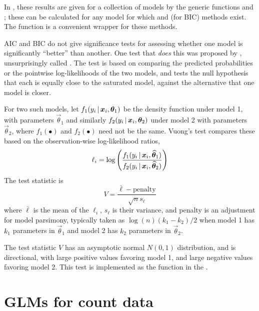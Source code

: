 \documentclass[11pt]{book}\usepackage[]{graphicx}\usepackage[]{color}
\begin{document}
In \R, these results are given for a collection of models by the generic functions
 and ; these can be calculated for any model for which 
 and (for BIC)  methods exist.
The  function  is a convenient wrapper for these
methods. 

AIC and BIC do not give significance tests for assessing whether one model is
significantly ``better'' than another.  One test that \emph{does} this was proposed by
\citet{Vuong:1989}, unsurprisingly called . 
The test is based on comparing the predicted probabilities
or the pointwise log-likelihoods of the two models, and tests the null hypothesis
that each is equally close to the saturated model, against the alternative that 
one model is closer. 

For two such models, let $f_1 (y_i \, | \, \bm{x}_i, \bm{\theta}_1)$
be the density function under model 1, with parameters $\vec{\theta}_1$
and similarly
$f_2 (y_i \, | \, \bm{x}_i, \bm{\theta}_2)$ under model 2 with parameters $\vec{\theta}_2$,
where $f_1(\bullet)$ and $f_2(\bullet)$ need not be the same.
Vuong's test compares these based on the observation-wise log-likelihood ratios,
\begin{equation*}
\ell_i = \log \left( 
              \frac{f_1 (y_i \, | \, \bm{x}_i, \bm{\widehat{\theta}}_1)}
                   {f_2 (y_i \, | \, \bm{x}_i, \bm{\widehat{\theta}}_2)} \right)
\end{equation*}
The test statistic is
\begin{equation*}
 V = \frac{\bar{\ell} - \textrm{penalty}} {\sqrt{n} s_\ell}
\end{equation*}
where $\bar{\ell}$ is the mean of the $\ell_i$, $s_\ell$ is their variance, and
penalty is an adjustment for model parsimony, typically taken as
$\log(n) (k_1 - k_2)/2$ when model 1 has $k_1$ parameters in $\vec{\theta}_1$
and model 2 has $k_2$ parameters in $\vec{\theta}_2$.

The test statistic $V$ has an asymptotic normal $N(0,1)$ distribution,
and is directional, with large positive values favoring model 1, and large
negative values favoring model 2.
This test is implemented as the  function in the .

\section{GLMs for count data}\label{sec:glm-count}
\end{document}
